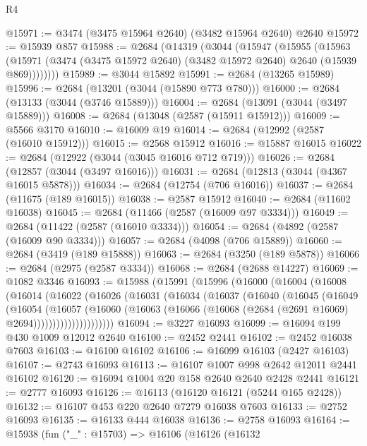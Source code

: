 \begin{lexlean}{R4}
\begin{coremodule}
@15971 := @3474 (@3475 @15964 @2640) (@3482 @15964 @2640) @2640
@15972 := @15939 @857
@15988 := @2684
    (@14319
      (@3044
        (@15947
          (@15955
            (@15963
              (@15971 (@3474 (@3475 @15972 @2640) (@3482 @15972 @2640) @2640 (@15939 @869))))))))
@15989 := @3044 @15892
@15991 := @2684 (@13265 @15989)
@15996 := @2684 (@13201 (@3044 (@15890 @773 @780)))
@16000 := @2684 (@13133 (@3044 (@3746 @15889)))
@16004 := @2684 (@13091 (@3044 (@3497 @15889)))
@16008 := @2684 (@13048 (@2587 (@15911 @15912)))
@16009 := @5566 @3170
@16010 := @16009 @19
@16014 := @2684 (@12992 (@2587 (@16010 @15912)))
@16015 := @2568 @15912
@16016 := @15887 @16015
@16022 := @2684 (@12922 (@3044 (@3045 @16016 @712 @719)))
@16026 := @2684 (@12857 (@3044 (@3497 @16016)))
@16031 := @2684 (@12813 (@3044 (@4367 @16015 @5878)))
@16034 := @2684 (@12754 (@706 @16016))
@16037 := @2684 (@11675 (@189 @16015))
@16038 := @2587 @15912
@16040 := @2684 (@11602 @16038)
@16045 := @2684 (@11466 (@2587 (@16009 @97 @3334)))
@16049 := @2684 (@11422 (@2587 (@16010 @3334)))
@16054 := @2684 (@4892 (@2587 (@16009 @90 @3334)))
@16057 := @2684 (@4098 (@706 @15889))
@16060 := @2684 (@3419 (@189 @15888))
@16063 := @2684 (@3250 (@189 @5878))
@16066 := @2684 (@2975 (@2587 @3334))
@16068 := @2684 (@2688 @14227)
@16069 := @1082 @3346
@16093 := @15988
    (@15991
      (@15996
        (@16000
          (@16004
            (@16008
              (@16014
                (@16022
                  (@16026
                    (@16031
                      (@16034
                        (@16037
                          (@16040
                            (@16045
                              (@16049
                                (@16054
                                  (@16057
                                    (@16060
                                      (@16063
                                        (@16066
                                          (@16068 (@2684 (@2691 @16069) @2694)))))))))))))))))))))
@16094 := @3227 @16093
@16099 := @16094 @199 @430 @1009 @12012 @2640
@16100 := @2452 @2441
@16102 := @2452 @16038 @7603
@16103 := @16100 @16102
@16106 := @16099 @16103 (@2427 @16103)
@16107 := @2743 @16093
@16113 := @16107 @1007 @998 @2642 @12011 @2441 @16102
@16120 := @16094 @1004 @20 @158 @2640 @2640 @2428 @2441
@16121 := @2777 @16093
@16126 := @16113 (@16120 @16121 (@5244 @165 @2428))
@16132 := @16107 @453 @220 @2640 @7279 @16038 @7603
@16133 := @2752 @16093
@16135 := @16133 @444 @16038
@16136 := @2758 @16093
@16164 := @15938
    (fun ("_" : @15703) =>
    @16106
      (@16126
        (@16132

\end{coremodule}
\end{lexlean}

